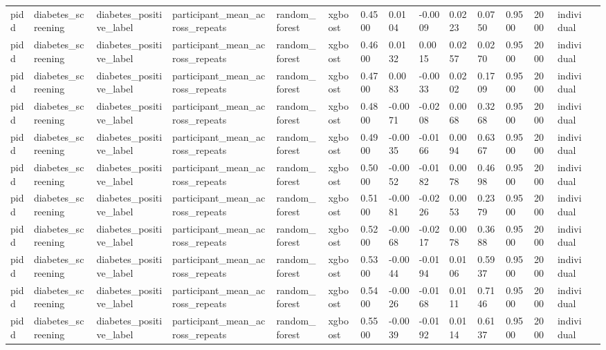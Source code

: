 \begin{tabular}{lllllllllllllll}
pidd & diabetes\_screening & diabetes\_positive\_label & participant\_mean\_across\_repeats & random\_forest & xgboost & 0.4500 & 0.0104 & -0.0009 & 0.0223 & 0.0750 & 0.9500 & 2000 & individual &  \\
pidd & diabetes\_screening & diabetes\_positive\_label & participant\_mean\_across\_repeats & random\_forest & xgboost & 0.4600 & 0.0132 & 0.0015 & 0.0257 & 0.0270 & 0.9500 & 2000 & individual &  \\
pidd & diabetes\_screening & diabetes\_positive\_label & participant\_mean\_across\_repeats & random\_forest & xgboost & 0.4700 & 0.0083 & -0.0033 & 0.0202 & 0.1709 & 0.9500 & 2000 & individual &  \\
pidd & diabetes\_screening & diabetes\_positive\_label & participant\_mean\_across\_repeats & random\_forest & xgboost & 0.4800 & -0.0071 & -0.0208 & 0.0068 & 0.3268 & 0.9500 & 2000 & individual &  \\
pidd & diabetes\_screening & diabetes\_positive\_label & participant\_mean\_across\_repeats & random\_forest & xgboost & 0.4900 & -0.0035 & -0.0166 & 0.0094 & 0.6367 & 0.9500 & 2000 & individual &  \\
pidd & diabetes\_screening & diabetes\_positive\_label & participant\_mean\_across\_repeats & random\_forest & xgboost & 0.5000 & -0.0052 & -0.0182 & 0.0078 & 0.4698 & 0.9500 & 2000 & individual &  \\
pidd & diabetes\_screening & diabetes\_positive\_label & participant\_mean\_across\_repeats & random\_forest & xgboost & 0.5100 & -0.0081 & -0.0226 & 0.0053 & 0.2379 & 0.9500 & 2000 & individual &  \\
pidd & diabetes\_screening & diabetes\_positive\_label & participant\_mean\_across\_repeats & random\_forest & xgboost & 0.5200 & -0.0068 & -0.0217 & 0.0078 & 0.3688 & 0.9500 & 2000 & individual &  \\
pidd & diabetes\_screening & diabetes\_positive\_label & participant\_mean\_across\_repeats & random\_forest & xgboost & 0.5300 & -0.0044 & -0.0194 & 0.0106 & 0.5937 & 0.9500 & 2000 & individual &  \\
pidd & diabetes\_screening & diabetes\_positive\_label & participant\_mean\_across\_repeats & random\_forest & xgboost & 0.5400 & -0.0026 & -0.0168 & 0.0111 & 0.7146 & 0.9500 & 2000 & individual &  \\
pidd & diabetes\_screening & diabetes\_positive\_label & participant\_mean\_across\_repeats & random\_forest & xgboost & 0.5500 & -0.0039 & -0.0192 & 0.0114 & 0.6137 & 0.9500 & 2000 & individual &  \\

\end{tabular}
